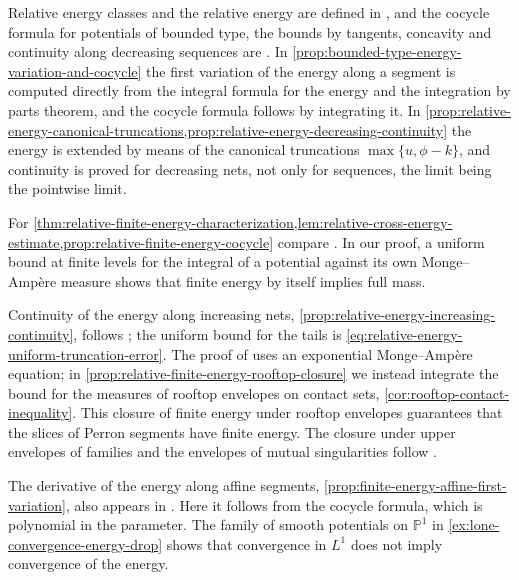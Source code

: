Relative energy classes and the relative energy are defined in \cite[Definitions~3.1.5--3.1.6]{XiaSampleBook}, and the cocycle formula for potentials of bounded type, the bounds by tangents, concavity and continuity along decreasing sequences are \cite[Lemmas~3.1.3--3.1.5 and Proposition~3.1.16]{XiaSampleBook}. In \cref{prop:bounded-type-energy-variation-and-cocycle} the first variation of the energy along a segment is computed directly from the integral formula for the energy and the integration by parts theorem, and the cocycle formula follows by integrating it. In \cref{prop:relative-energy-canonical-truncations,prop:relative-energy-decreasing-continuity} the energy is extended by means of the canonical truncations $\max\{u,\phi-k\}$, and continuity is proved for decreasing nets, not only for sequences, the limit being the pointwise limit.

For \cref{thm:relative-finite-energy-characterization,lem:relative-cross-energy-estimate,prop:relative-finite-energy-cocycle} compare \cite[Proposition~3.1.17, Lemma~3.1.6, Corollary~3.1.6 and Proposition~3.1.18]{XiaSampleBook}. In our proof, a uniform bound at finite levels for the integral of a potential against its own Monge--Amp\`ere measure shows that finite energy by itself implies full mass.

Continuity of the energy along increasing nets, \cref{prop:relative-energy-increasing-continuity}, follows \cite[Proposition~3.1.20]{XiaSampleBook}; the uniform bound for the tails is \eqref{eq:relative-energy-uniform-truncation-error}. The proof of \cite[Proposition~3.1.21]{XiaSampleBook} uses an exponential Monge--Amp\`ere equation; in \cref{prop:relative-finite-energy-rooftop-closure} we instead integrate the bound for the measures of rooftop envelopes on contact sets, \cref{cor:rooftop-contact-inequality}. This closure of finite energy under rooftop envelopes guarantees that the slices of Perron segments have finite energy. The closure under upper envelopes of families and the envelopes of mutual singularities follow \cite[Propositions~3.1.23--3.1.24]{XiaSampleBook}.

The derivative of the energy along affine segments, \cref{prop:finite-energy-affine-first-variation}, also appears in \cite[Lemma~3.1.11]{XiaSampleBook}. Here it follows from the cocycle formula, which is polynomial in the parameter. The family of smooth potentials on $\mathbb P^1$ in \cref{ex:lone-convergence-energy-drop} shows that convergence in $L^1$ does not imply convergence of the energy.

